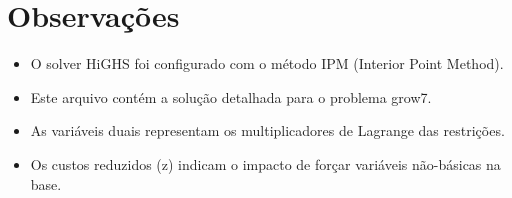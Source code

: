 \documentclass[12pt]{article}
\begin{document}
\section{Observações}

\begin{itemize}
\item O solver HiGHS foi configurado com o método IPM (Interior Point Method).
\item Este arquivo contém a solução detalhada para o problema grow7.
\item As variáveis duais representam os multiplicadores de Lagrange das restrições.
\item Os custos reduzidos (z) indicam o impacto de forçar variáveis não-básicas na base.
\end{itemize}
\end{document}
